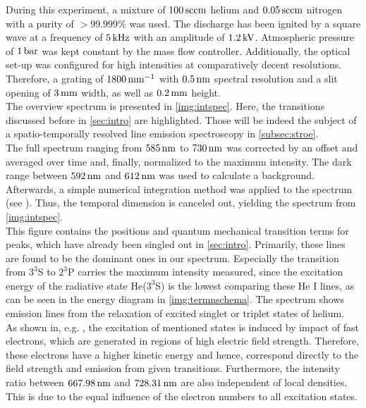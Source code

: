 \documentclass[a4paper,10pt,twoside]{article}
\begin{document}
			During this experiment, a mixture of $\unit[100]{sccm}$ helium and $\unit[0.05]{sccm}$ nitrogen with a purity of $>99.999\%$ was used. The discharge has been ignited by a square wave at a frequency of $\unit[5]{kHz}$ with an amplitude of $\unit[1.2]{kV}$. Atmospheric pressure of $\unit[1]{bar}$ was kept constant by the mass flow controller. Additionally, the optical set-up was configured for high intensities at comparatively decent resolutions. Therefore, a grating of $\unit[1800]{mm^{-1}}$ with $\unit[0.5]{nm}$ spectral resolution and a slit opening of $\unit[3]{mm}$ width, as well as $\unit[0.2]{mm}$ height.\\ 
			The overview spectrum is presented in \autoref{img:intspec}. Here, the transitions discussed before in \autoref{sec:intro} are highlighted. Those will be indeed the subject of a spatio-temporally resolved line emission spectroscopy in \autoref{subsec:stroe}.\\
			The full spectrum ranging from $\unit[585]{nm}$ to $\unit[730]{nm}$ was corrected by an offset and averaged over time and, finally, normalized to the maximum intensity. The dark range between $\unit[592]{nm}$ and $\unit[612]{nm}$ was used to calculate a background. Afterwards, a simple numerical integration method was applied to the spectrum (see \cite{Wiki:Euler}). Thus, the temporal dimension is canceled out, yielding the spectrum from \autoref{img:intspec}.\\
			This figure contains the positions and quantum mechanical transition terms for peaks, which have already been singled out in \autoref{sec:intro}. Primarily, these lines are found to be the dominant ones in our spectrum. Especially the transition from $3^3$S to $2^3$P carries the maximum intensity measured, since the excitation energy of the radiative state He($3^3$S) is the lowest comparing these He I lines, as can be seen in the energy diagram in \autoref{img:termnschema}. The spectrum shows emission lines from the relaxation of excited singlet or triplet states of helium.\\
			As shown in, e.g. \cite{linratio1_14}, the excitation of mentioned states is induced by impact of fast electrons, which are generated in regions of high electric field strength. Therefore, these electrons have a higher kinetic energy and hence, correspond directly to the field \newline strength and emission from given transitions. Furthermore, the intensity ratio between $\unit[667.98]{nm}$ and $\unit[728.31]{nm}$ are also independent of local densities. This is due to the equal influence of the electron numbers to all excitation states.\\
\end{document}
